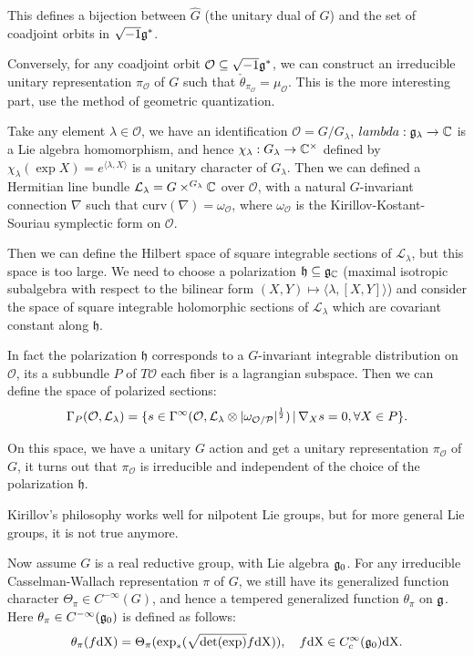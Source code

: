 This defines a bijection between $\widehat{G}$ (the unitary dual of $G$) and the set of coadjoint orbits in $\sqrt{-1}\mathfrak{g}^*$.

Conversely, for any coadjoint orbit $\mathcal{O} \subseteq \sqrt{-1}\mathfrak{g}^*$, we can construct an irreducible unitary representation $\pi_{\mathcal{O}}$ of $G$ such that $\check{\theta}_{\pi_{\mathcal{O}}} = \mu_{\mathcal{O}}$. This is the more interesting part, use the method of geometric quantization.

Take any element $\lambda \in \mathcal{O}$, we have an identification $\mathcal{O} = G/G_{\lambda}$, $lambda: \mathfrak{g}_{\lambda} \to \mathbb{C}$ is a Lie algebra homomorphism, and hence $\chi_{\lambda} : G_{\lambda} \to \mathbb{C}^\times$ defined by $\chi_{\lambda}(\exp X) = e^{\langle \lambda,X \rangle}$ is a unitary character of $G_{\lambda}$. Then we can defined a Hermitian line bundle $\mathcal{L}_{\lambda} = G \times^{G_{\lambda}} \mathbb{C}$ over $\mathcal{O}$, with a natural $G$-invariant connection $\nabla$ such that $\mathrm{curv}(\nabla) = \omega_{\mathcal{O}}$, where $\omega_{\mathcal{O}}$ is the Kirillov-Kostant-Souriau symplectic form on $\mathcal{O}$.

Then we can define the Hilbert space of square integrable sections of $\mathcal{L}_{\lambda}$, but this space is too large. We need to choose a polarization $\mathfrak{h} \subseteq \mathfrak{g}_{\mathbb{C}}$ (maximal isotropic subalgebra with respect to the bilinear form $(X,Y) \mapsto \langle \lambda, [X,Y] \rangle$) and consider the space of square integrable holomorphic sections of $\mathcal{L}_{\lambda}$ which are covariant constant along $\mathfrak{h}$.

In fact the polarization $\mathfrak{h}$ corresponds to a $G$-invariant integrable distribution on $\mathcal{O}$, its a subbundle $P$ of $T\mathcal{O}$ each fiber is a lagrangian subspace.
Then we can define the space of polarized sections:
\[\Gamma_P(\mathcal{O},\mathcal{L}_{\lambda}) = \{s \in \Gamma^{\infty}(\mathcal{O},\mathcal{L}_{\lambda} \otimes \lvert\omega_{\mathcal{O/P}}\rvert^{\frac{1}{2}})\,|\,\nabla_X s = 0, \forall X \in P\}.\]

On this space, we have a unitary $G$ action and get a unitary representation $\pi_{\mathcal{O}}$ of $G$, it turns out that $\pi_{\mathcal{O}}$ is irreducible and independent of the choice of the polarization $\mathfrak{h}$.

Kirillov's philosophy works well for nilpotent Lie groups, but for more general Lie groups, it is not true anymore.


Now assume $G$ is a real reductive group, with Lie algebra $\mathfrak{g}_0$. For any irreducible Casselman-Wallach representation $\pi$ of $G$, we still have its generalized function character $\Theta_\pi \in C^{-\infty}(G)$, and hence a tempered generalized function $\theta_\pi$ on $\mathfrak{g}$. Here $\theta_{\pi} \in C^{-\infty}(\mathfrak{g}_0)$ is defined as follows:
\[\theta_\pi(f\mathrm{dX}) = \Theta_\pi(\exp_{*}(\sqrt{\mathrm{det(exp)}}f\mathrm{dX})), \quad f\mathrm{dX} \in C_{c}^{\infty}(\mathfrak{g}_0)\mathrm{dX}.\]

